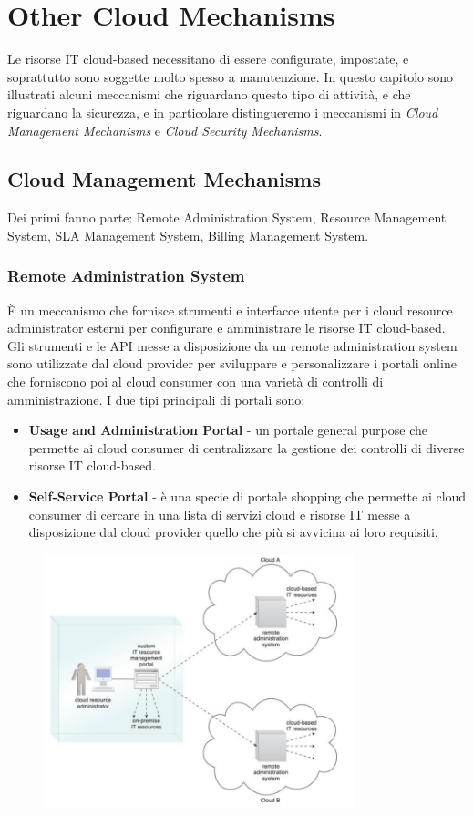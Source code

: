 \chapter{Other Cloud Mechanisms}
Le risorse IT cloud-based necessitano di essere configurate, impostate, e soprattutto sono soggette molto spesso a manutenzione. In questo capitolo sono illustrati alcuni meccanismi che riguardano questo tipo di attività, e che riguardano la sicurezza, e in particolare distingueremo i meccanismi in \textit{Cloud Management Mechanisms} e \textit{Cloud Security Mechanisms}.

\section{Cloud Management Mechanisms}
Dei primi fanno parte: Remote Administration System, Resource Management System, SLA Management System, Billing Management System.

\subsection{Remote Administration System}
È un meccanismo che fornisce strumenti e interfacce utente per i cloud resource administrator esterni per configurare e amministrare le risorse IT cloud-based. Gli strumenti e le API messe a disposizione da un remote administration system sono utilizzate dal cloud provider per sviluppare e personalizzare i portali online che forniscono poi al cloud consumer con una varietà di controlli di amministrazione. I due tipi principali di portali sono:
\begin{itemize}
    \item \textbf{Usage and Administration Portal} - un portale general purpose che permette ai cloud consumer di centralizzare la gestione dei controlli di diverse risorse IT cloud-based.
    \item \textbf{Self-Service Portal} - è una specie di portale shopping che permette ai cloud consumer di cercare in una lista di servizi cloud e risorse IT messe a disposizione dal cloud provider quello che più si avvicina ai loro requisiti.
\end{itemize}

\begin{figure}[ht]
    \centering
    \includegraphics[width=9cm]{./Images/cap10/10.1.png}
\end{figure}

